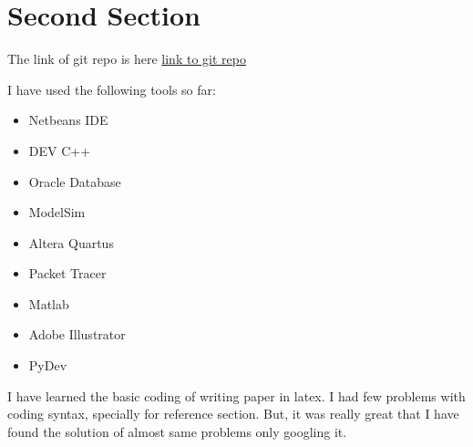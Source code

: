 \documentclass[conference]{IEEEtran}
\begin{document}
\section{Second Section}
The link of git repo is here \href{http://www.sharelatex.com}{link to git repo}  

I have used the following tools so far:
\begin{itemize}
\item Netbeans IDE
\item DEV C++
\item Oracle Database
\item ModelSim
\item Altera Quartus
\item Packet Tracer
\item Matlab
\item Adobe Illustrator
\item PyDev

\end{itemize}

I have learned the basic coding of writing paper in latex. I had few problems with coding syntax, specially for reference section. But, it was really great that I have found the solution of almost same problems only googling it.   
\end{document}
